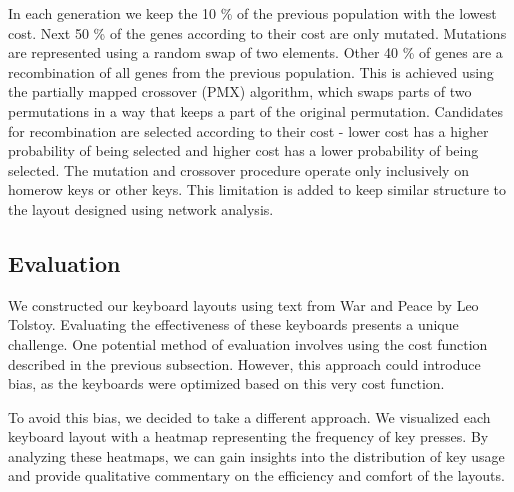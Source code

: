 \documentclass[9pt,twocolumn,twoside]{pnas-report}
\begin{document}
{In each generation we keep the 10 \% of the previous population with the lowest cost.
Next 50 \% of the genes according to their cost are only mutated.
Mutations are represented using a random swap of two elements.
Other 40 \% of genes are a recombination of all genes from the previous population.
This is achieved using the partially mapped crossover (PMX) algorithm, which swaps parts of two permutations in a way that keeps a part of the original permutation.
Candidates for recombination are selected according to their cost - lower cost has a higher probability of being selected and higher cost has a lower probability of being selected.
The mutation and crossover procedure operate only inclusively on homerow keys or other keys.
This limitation is added to keep similar structure to the layout designed using network analysis.

\subsection*{Evaluation}

We constructed our keyboard layouts using text from War and Peace by Leo Tolstoy.
Evaluating the effectiveness of these keyboards presents a unique challenge.
One potential method of evaluation involves using the cost function described in the previous subsection.
However, this approach could introduce bias, as the keyboards were optimized based on this very cost function.

To avoid this bias, we decided to take a different approach.
We visualized each keyboard layout with a heatmap representing the frequency of key presses.
By analyzing these heatmaps, we can gain insights into the distribution of key usage and provide qualitative commentary on the efficiency and comfort of the layouts.

}




\end{document}
